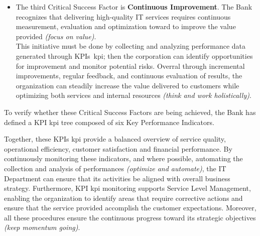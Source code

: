 \begin{itemize}
    
    \item The third Critical Success Factor is \textbf{Continuous Improvement}. The Bank recognizes that delivering high-quality IT services requires continuous measurement, evaluation and optimization toward to improve the value provided \textit{(focus on value)}. \\
    This initiative must be done by collecting and analyzing performance data generated through KPIs~\gls{kpi}; then the corporation can identify opportunities for improvement and monitor potential risks.
    Overral through incremental improvements, regular feedback, and continuous evaluation of results, the organization can steadily increase the value delivered to customers while optimizing both services and internal resources \textit{(think and work holistically)}.
\end{itemize}

To verify whether these Critical Success Factors are being achieved, the Bank has defined a KPI \gls{kpi} tree composed of six Key Performance Indicators.


Together, these KPIs \gls{kpi} provide a balanced overview of service quality, operational efficiency, customer satisfaction and financial performance.
By continuously monitoring these indicators, and where possible, automating the collection and analysis of performances \textit{(optimize and automate)}, the IT Department can ensure that its activities be aligned with overall business strategy.
Furthermore, KPI \gls{kpi} monitoring supports Service Level Management, enabling the organization to identify areas that require corrective actions and ensure that the service provided accomplish the customer expectations. Moreover, all these procedures ensure the continuous progress toward its strategic objectives \textit{(keep momentum going)}.


